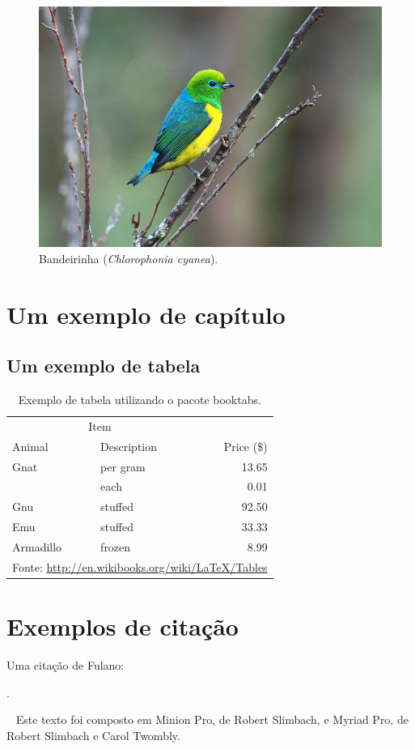 \documentclass[11pt,a5paper]{memoir}
\begin{document}
\begin{figure}
\centering
\includegraphics[width=0.6\linewidth]{bandeirinha}
\caption{Bandeirinha (\textit{Chlorophonia cyanea}).}
\label{fig:bandeirinha}
\end{figure}




\chapter{Um exemplo de capítulo}
\section{Um exemplo de tabela}
\begin{table}
\caption{Exemplo de tabela utilizando o pacote \textsf{booktabs}.}
\begin{tabular}{llr}
\toprule
\multicolumn{2}{c}{Item} \\
\cmidrule(r){1-2}
Animal    & Description & Price (\$) \\
\midrule
Gnat      & per gram    & 13.65      \\
          & each        & 0.01       \\
Gnu       & stuffed     & 92.50      \\
Emu       & stuffed     & 33.33      \\
Armadillo & frozen      & 8.99       \\
\bottomrule
\multicolumn{3}{l}{\footnotesize Fonte: \url{http://en.wikibooks.org/wiki/LaTeX/Tables}}
\end{tabular}
\end{table}

\chapter{Exemplos de citação}

Uma citação de Fulano:

.

\cite{fulano}



\backmatter %
\cleardoublepage
\thispagestyle{empty} %
~\vfill
Este texto foi composto em Minion Pro, de Robert Slimbach, e Myriad Pro, de Robert Slimbach e Carol Twombly.
\end{document}
